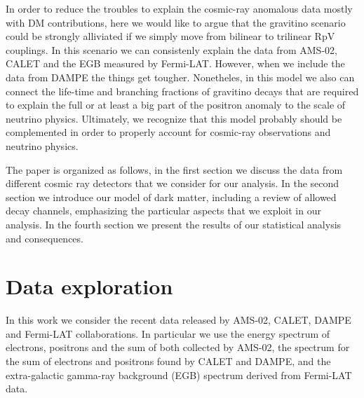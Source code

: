 \documentclass[a4paper,11pt]{article}
\newcommand*{\blue}{\textcolor{blue}}
\begin{document}
In order to reduce the troubles to explain the cosmic-ray anomalous data mostly with DM contributions, here we would like to argue that the gravitino scenario could be strongly alliviated if we simply move from bilinear to trilinear RpV couplings. In this scenario we can consistenly explain the data from AMS-02, CALET and the EGB measured by Fermi-LAT. However, when we include the data from DAMPE the things get tougher. Nonetheles, in this model we also can connect the life-time and branching fractions of gravitino decays that are required to explain the full or at least a big part of the positron anomaly to the scale of neutrino physics. Ultimately, we recognize that this model probably should be complemented in order to properly account for cosmic-ray observations and neutrino physics.

The paper is organized as follows, in the first section we discuss the data from different cosmic ray detectors that we consider for our analysis. In the second section we introduce our model of dark matter, including a review of allowed decay channels, emphasizing the particular aspects that we exploit in our analysis. In the fourth section we present the results of our statistical analysis and consequences.


\section{Data exploration}

In this work we consider the recent data released by AMS-02, CALET, DAMPE and Fermi-LAT collaborations. In particular we use the energy spectrum of electrons, positrons and the sum of both collected by AMS-02, the spectrum for the sum of electrons and positrons found by CALET and DAMPE, and the extra-galactic gamma-ray background (EGB) spectrum derived from Fermi-LAT data.



\end{document}
